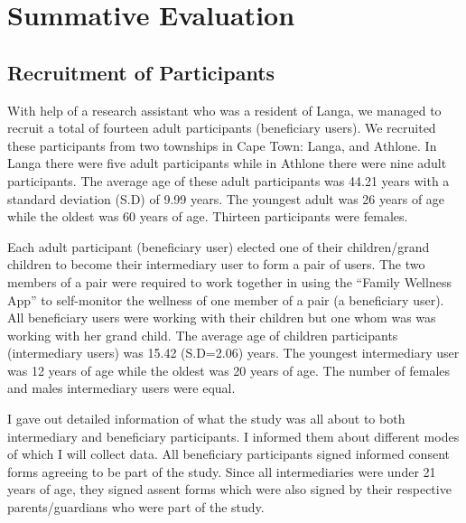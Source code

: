 
\chapter{Summative Evaluation} %

\label{summativeevalchapter} %


\section{Recruitment of Participants}
With help of a research assistant who was a resident of Langa,  we managed to recruit a total of fourteen adult participants (beneficiary users). We recruited these participants from two townships in Cape Town: Langa, and Athlone. In Langa there were five adult participants while in Athlone there were nine adult participants. The average age of these adult participants was 44.21 years with a standard deviation (S.D) of 9.99 years. The youngest adult was 26 years of age while the oldest was 60 years of age. Thirteen participants were females.

Each adult participant (beneficiary user) elected one of their children/grand children to become their intermediary user to form a pair of users. The two members of a pair were required to work together in using the ``Family Wellness App'' to self-monitor the wellness of one member of a pair (a beneficiary user). All beneficiary users were working with their children but one whom was was working with her grand child.  The average age of children participants (intermediary users) was 15.42 (S.D=2.06) years. The youngest intermediary user was 12 years of age while the oldest was 20 years of age. The number of females and males intermediary users were equal.

I gave out detailed information of what the study was all about to both intermediary and beneficiary participants. I informed them about different modes of which I will collect data. All beneficiary participants signed informed consent forms agreeing to be part of the study. Since all intermediaries were under 21 years of age, they signed assent forms which were also signed by their respective parents/guardians who were part of the study.

